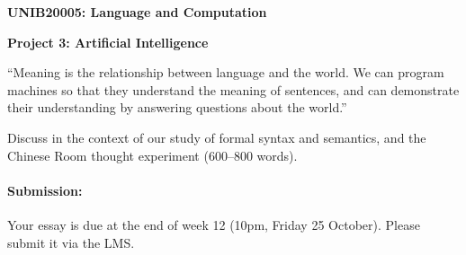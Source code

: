 \documentclass[a4paper,11pt]{article}
\begin{document}
\centerline{\LARGE\bf UNIB20005: Language and Computation}\vspace{2ex}

\centerline{\large\bf Project 3: Artificial Intelligence}\vspace{2ex}

``Meaning is the relationship between language and the world.
We can program machines so that they understand the meaning of sentences, and
can demonstrate their understanding by answering questions about the world.''

Discuss in the context of our study of formal syntax and semantics, and the Chinese Room thought experiment (600--800 words).

\paragraph{Submission:}
Your essay is due at the end of week 12 (10pm, Friday 25 October). Please submit it via the LMS.
\end{document}
